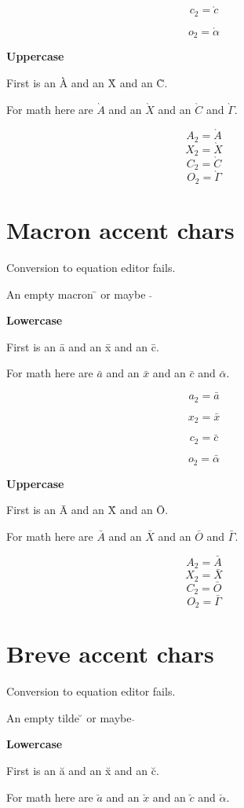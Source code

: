 ﻿\documentclass{article}
\begin{document}
$$c_2=\grave{c}$$

$$o_2=\grave{\alpha}$$

\textbf{Uppercase}

First is an \`{A} and an \`{X} and an \`{C}.

For math here are $\grave{A}$ and an $\grave{X}$ and an $\grave{C}$ and $\grave{\Gamma}$.

$$A_2=\grave{A}$$
$$X_2=\grave{X}$$
$$C_2=\grave{C}$$
$$O_2=\grave{\Gamma}$$




\section{Macron accent chars}

Conversion to equation editor fails.

An empty macron \={} or maybe $\bar{}$

\textbf{Lowercase}

First is an \={a} and an \={x} and an \={c}.

For math here are $\bar{a}$ and an $\bar{x}$ and an $\bar{c}$ and $\bar{\alpha}$.

$$a_2=\bar{a}$$

$$x_2=\bar{x}$$

$$c_2=\bar{c}$$

$$o_2=\bar{\alpha}$$

\textbf{Uppercase}

First is an \={A} and an \={X} and an \={O}.

For math here are $\bar{A}$ and an $\bar{X}$ and an $\bar{O}$ and $\bar{\Gamma}$.

$$A_2=\bar{A}$$
$$X_2=\bar{X}$$
$$C_2=\bar{O}$$
$$O_2=\bar{\Gamma}$$




\section{Breve accent chars}

Conversion to equation editor fails.

An empty tilde \u{} or maybe $\breve{}$

\textbf{Lowercase}

First is an \u{a} and an \u{x} and an \u{c}.

For math here are $\breve{a}$ and an $\breve{x}$ and an $\breve{c}$ and $\breve{\alpha}$.
\end{document}
